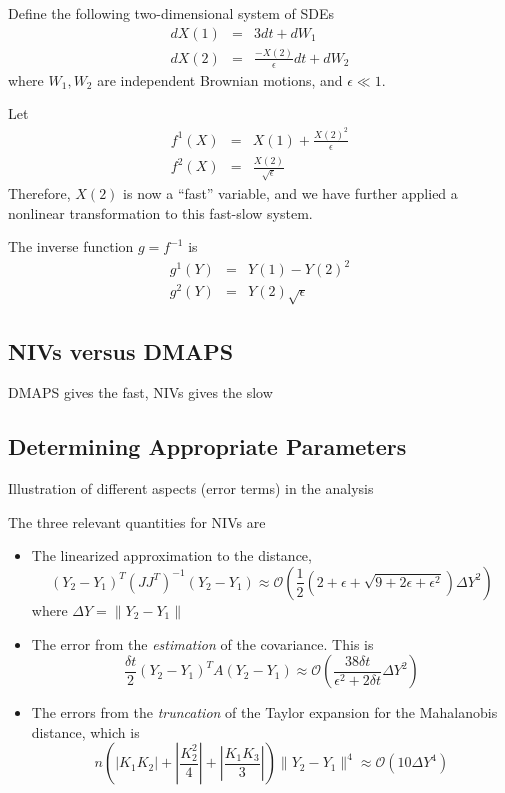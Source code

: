 \documentclass[1p]{elsarticle}
\begin{document}
 Define the following two-dimensional system of SDEs
\begin{eqnarray}
dX(1) &=& 3 dt + dW_1 \\ 
dX(2) &=& \frac{-X(2)}{\epsilon} dt + dW_2 
\end{eqnarray}
where $W_1, W_2$ are independent Brownian motions, and $\epsilon \ll 1$.

Let
\begin{eqnarray}
f^1(X) &=& X(1) + \frac{ X(2)^2}{\epsilon} \\
f^2(X) &=& \frac{X(2)}{\sqrt{\epsilon}}
\end{eqnarray}
Therefore, $X(2)$ is now a ``fast'' variable, and we have further applied a nonlinear transformation to this fast-slow system. 

The inverse function $g = f^{-1}$ is
\begin{eqnarray}
g^1(Y) &=& Y(1) - Y(2)^2 \\
g^2(Y) &=& Y(2) \sqrt{\epsilon}
\end{eqnarray}


 
\subsection{NIVs versus DMAPS}

DMAPS gives the fast, NIVs gives the slow 

\subsection{Determining Appropriate Parameters}

Illustration of different aspects (error terms) in the analysis

The three relevant quantities for NIVs are 
\begin{itemize}
\item The linearized approximation to the distance,
%
\begin{equation}
(Y_2 - Y_1)^T (JJ^T)^{-1} (Y_2 - Y_1) 
\approx \mathcal{O} \left(  \frac{1}{2} \left( 2 + \epsilon + \sqrt{ 9 + 2 \epsilon + \epsilon^2}\right) \Delta Y^2\right) 
\end{equation}
where $\Delta Y =  \|Y_2 - Y_1\|$

\item The error from the {\em estimation} of the covariance.
%
This is
\begin{equation}
\frac{\delta t}{2} (Y_2 - Y_1)^T A (Y_2 - Y_1) \approx \mathcal{O} \left( \frac{38 \delta t}{\epsilon ^2 + 2 \delta t}\Delta Y^2 \right)
\end{equation}

\item The errors from the {\em truncation} of the Taylor expansion for the Mahalanobis distance, which is 
\begin{equation}
n \left( \left| K_1 K_2 \right| + \left| \frac{ K_2^2}{4} \right|  + \left| \frac{K_1 K_3}{3} \right|  \right) \| Y_2 - Y_1 \| ^4 \approx \mathcal{O} \left( 10 \Delta Y^4  \right) 
\end{equation}

\end{itemize}
\end{document}
